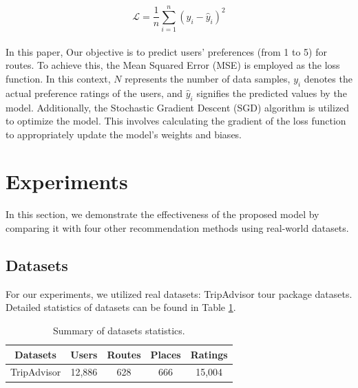 \documentclass[]{article}
\begin{document}
\begin{equation}
	\mathcal{L} = \frac{1}{n} \sum_{i=1}^{n} (y_i - \hat{y}_i)^2
	\label{equation8}
\end{equation}
\\
In this paper, Our objective is to predict users' preferences (from 1 to 5) for routes. To achieve this, the Mean Squared Error (MSE) is employed as the loss function. In this context, $N$ represents the number of data samples, $y_i$ denotes the actual preference ratings of the users, and $\hat{y}_i$ signifies the predicted values by the model. Additionally, the Stochastic Gradient Descent (SGD) algorithm is utilized to optimize the model. This involves calculating the gradient of the loss function to appropriately update the model's weights and biases.

\section{Experiments}
\label{sec:Exe}
In this section, we demonstrate the effectiveness of the proposed model by comparing it with four other recommendation methods using real-world datasets.

\subsection{Datasets}
For our experiments, we utilized real datasets: TripAdvisor tour package datasets. Detailed statistics of datasets can be found in Table \ref{sec6:data}.
\begin{table}[htb!]
	\centering
	\setlength{\tabcolsep}{12pt}
	\renewcommand{\arraystretch}{1.4}
	\caption{Summary of datasets statistics.}
	\label{sec6:data}
	\begin{tabular}{@{}ccccc@{}}
		\toprule
		Datasets    & Users  & Routes & Places & Ratings \\
		\midrule
		TripAdvisor & 12,886 & 628    & 666    & 15,004  \\
		\bottomrule 
	\end{tabular}
\end{table}
\end{document}
